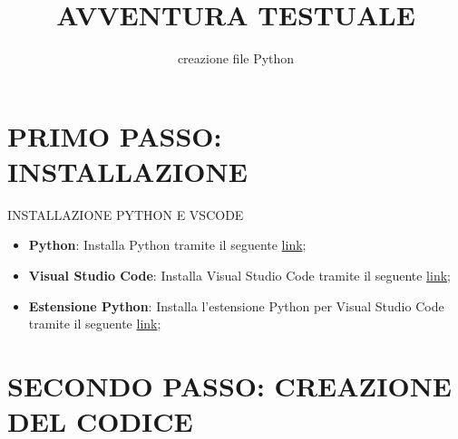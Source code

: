 \documentclass[aspectratio=1610]{beamer}
\title{AVVENTURA TESTUALE}
\subtitle{creazione file Python}
\date{}
\institute{}
\begin{document}
\begin{frame}
    \titlepage
\end{frame}

\section{PRIMO PASSO: INSTALLAZIONE}

\begin{frame}{INSTALLAZIONE PYTHON E VSCODE}
    \begin{itemize}
        \justifying
        \item \textbf{Python}: Installa Python tramite il seguente \href{https://www.python.org/downloads}{link};
        \pause
        \item \textbf{Visual Studio Code}: Installa Visual Studio Code tramite il seguente \href{https://code.visualstudio.com/Download}{link};
        \pause
        \item \textbf{Estensione Python}: Installa l'estensione Python per Visual Studio Code tramite il seguente \href{https://marketplace.visualstudio.com/items?itemName=ms-python.python}{link};
    \end{itemize}
\end{frame}

\section{SECONDO PASSO: CREAZIONE DEL CODICE}
\end{document}
